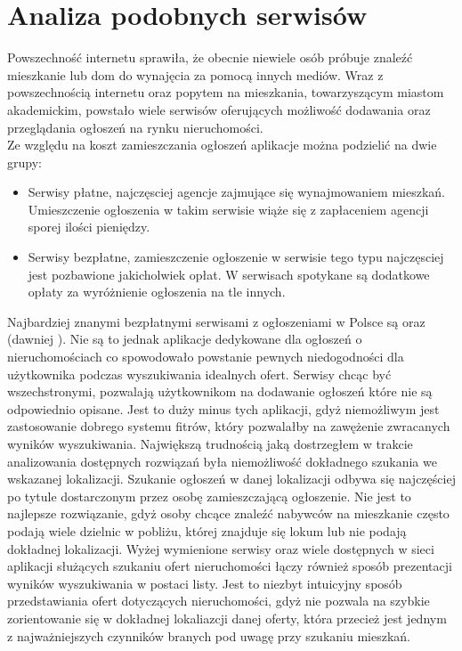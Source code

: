 \section{Analiza podobnych serwisów}
\label{sec:analizaSerwisow}
Powszechność internetu sprawiła, że obecnie niewiele osób próbuje znaleźć mieszkanie lub dom do wynajęcia za pomocą innych mediów\cite{tns}. Wraz z powszechnością internetu oraz popytem na mieszkania, towarzyszącym miastom akademickim, powstało wiele serwisów oferujących możliwość dodawania oraz przeglądania ogłoszeń na rynku nieruchomości.\\
Ze względu na koszt zamieszczania ogłoszeń aplikacje można podzielić na dwie grupy:
\begin{itemize}
\item Serwisy płatne, najczęsciej agencje zajmujące się wynajmowaniem mieszkań. Umieszczenie ogłoszenia w takim serwisie wiąże się z zapłaceniem agencji sporej ilości pieniędzy.
\item Serwisy bezpłatne, zamieszczenie ogłoszenie w serwisie tego typu najczęsciej jest pozbawione jakicholwiek opłat. W serwisach spotykane są dodatkowe opłaty za wyróżnienie ogłoszenia na tle innych.
\end{itemize}
Najbardziej znanymi bezpłatnymi serwisami z ogłoszeniami w Polsce są  oraz  (dawniej ). Nie są to jednak aplikacje dedykowane dla ogłoszeń o nieruchomościach co spowodowało powstanie pewnych niedogodności dla użytkownika podczas wyszukiwania idealnych ofert. Serwisy chcąc być wszechstronymi, pozwalają użytkownikom na dodawanie ogłoszeń które nie są odpowiednio opisane. Jest to duży minus tych aplikacji, gdyż niemożliwym jest zastosowanie dobrego systemu fitrów, który pozwalałby na zawężenie zwracanych wyników wyszukiwania. Największą trudnością jaką dostrzegłem w trakcie analizowania dostępnych rozwiązań była niemożliwość dokładnego szukania we wskazanej lokalizacji. Szukanie ogłoszeń w danej lokalizacji odbywa się najczęściej po tytule dostarczonym przez osobę zamieszczającą ogłoszenie. Nie jest to najlepsze rozwiązanie, gdyż osoby chcące znaleźć nabywców na mieszkanie często podają wiele dzielnic w pobliżu, której znajduje się lokum lub nie podają dokładnej lokalizacji. Wyżej wymienione serwisy oraz wiele dostępnych w sieci aplikacji służących szukaniu ofert nieruchomości łączy również sposób prezentacji wyników wyszukiwania w postaci listy. Jest to niezbyt intuicyjny sposób przedstawiania ofert dotyczących nieruchomości, gdyż nie pozwala na szybkie zorientowanie się w dokładnej lokaliazcji danej oferty, która przecież jest jednym z najważniejszych czynników branych pod uwagę przy szukaniu mieszkań.
